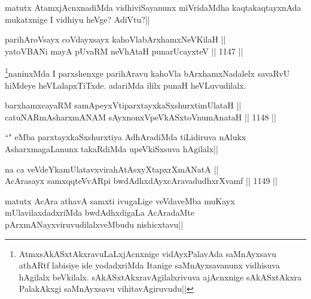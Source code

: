\begin{artha}
matutx AtamxjAcnxnadiMda vidhiviSayanunx miVridaMdha kaqtakaqtayxnAda mukatxnige I vidhiyu heVge? AdiVtu?||
\end{artha}


\begin{shl}
parihAroV\s sayx coVdayxsayx kahoVlabArxhamxNeV\s KilaH || \\
yatoV\s BANi mayA pUvaRM neVhAtaH punarUcayxteV ||  1147 ||  
\end{shl}

\begin{artha}
\footnote{AtmxsAkASxtAkxravuLaLxjAcnxnige vidAyxPalavAda saMnAyxsavu athARtf labisiye ide yodadxriMda Itanige saMnAyxsavanunx vidhisuva hAgilalx beVkilalx. sAkASxtAkxravAgilalxrivuva ajAcnxnige sAkASxtAkxra PalakAkxgi saMnAyxsavu vihitavAgiruvudu||}naninxMda I parxshenxge parihAravu kahoVla bArxhamxNadalelx savaRvU hiMdeye heVLalapxTiTxde. adariMda ililx punaH heVLuvudilalx.
\end{artha}


\begin{shl}
barxhamxcayaRM samApeyxVtiparxtayxkaSxshurxtimUlataH || \\
catuNARmAsharxmANAM sAyxnonxVpeVkASx\s toV\s numAnataH ||  1148 ||  
\end{shl}

\begin{artha}
``\stext" eMba parxtayxkaSxshurxtiya AdhAradiMda tiLidiruva nAlukx AsharxmagaLanunx takaRdiMda upeVkiSxsuva hAgilalx||
\end{artha}

\begin{shl}
na ca veVdeYkamUlatavxvirahAtAsxyXtapxrXmANatA || \\
AcArasayx samxqqteVvAR\s pi bwdAdhxdAyxcAravadudhxrXvamf ||  1149 ||  
\end{shl}

\begin{artha}
matutx AcAra athavA samxti ivugaLige veVdaveMba muKayx mUlavilaxdadxriMda bwdAdhxdigaLa AcAradaMte pArxmANayxviruvudilalxveMbudu nishicxtavu||
\end{artha}


